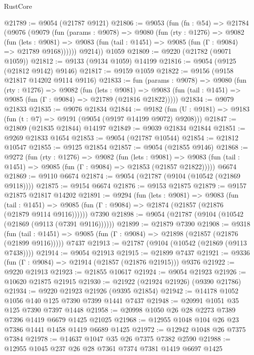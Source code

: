 \begin{lexlean}{RustCore}
\begin{coremodule}
@21789 := @9054 (@21787 @9121)
@21806 := @9053
    (fun (fn : @54) =>
    @21784
      (@9076
        (@9079
          (fun (params : @9078) =>
          @9080
            (fun (rty : @1276) =>
            @9082
              (fun (lets : @9081) =>
              @9083 (fun (tail : @1451) => @9085 (fun (Γ : @9084) => @21789 @9168))))))
        @9214))
    @1059
@21809 := @9220 (@21782 (@9071 @1059))
@21812 := @9133 (@9134 @1059) @14199
@21816 := @9054 (@9125 (@21812 @9142) @9146)
@21817 := @9159 @1059
@21822 := @9156 (@9158 @21817 @14202 @9114 @9116)
@21833 := fun (params : @9078) =>
  @9080
    (fun (rty : @1276) =>
    @9082
      (fun (lets : @9081) =>
      @9083 (fun (tail : @1451) => @9085 (fun (Γ : @9084) => @21789 (@21816 @21822)))))
@21834 := @9079 @21833
@21835 := @9076 @21834
@21844 := @9182
    (fun (U : @9181) => @9183 (fun (t : @7) => @9191 (@9054 (@9197 @14199 @9072) @9208)))
@21847 := @21809 (@21835 @21844) @14197
@21849 := @9039 @21834 @21844
@21851 := @9269 @21833 @1654
@21853 := @9054 (@21787 @10544)
@21854 := @21812 @10547
@21855 := @9125 @21854
@21857 := @9054 (@21855 @9146)
@21868 := @9272
    (fun (rty : @1276) =>
    @9082
      (fun (lets : @9081) =>
      @9083 (fun (tail : @1451) => @9085 (fun (Γ : @9084) => @21853 (@21857 @21822)))))
    @6674
@21869 := @9110 @6674
@21874 := @9054 (@21787 (@9104 (@10542 (@21869 @9118))))
@21875 := @9154 @6674
@21876 := @9153 @21875
@21879 := @9157 @21875 @21817 @14202
@21891 := @9294
    (fun (lets : @9081) =>
    @9083
      (fun (tail : @1451) =>
      @9085 (fun (Γ : @9084) => @21874 (@21857 (@21876 (@21879 @9114 @9116))))))
    @7390
@21898 := @9054 (@21787 (@9104 (@10542 (@21869 (@9113 (@7391 @9116))))))
@21899 := @21879 @7390
@21908 := @9318
    (fun (tail : @1451) => @9085 (fun (Γ : @9084) => @21898 (@21857 (@21876 (@21899 @9116)))))
    @7437
@21913 := @21787 (@9104 (@10542 (@21869 (@9113 @7438))))
@21914 := @9054 @21913
@21915 := @21899 @7437
@21921 := @9336 (fun (Γ : @9084) => @21914 (@21857 (@21876 @21915))) @9376
@21922 := @9220 @21913
@21923 := @21855 @10617
@21924 := @9054 @21923
@21926 := @10620 @21875 @21915
@21930 := @21922 (@21924 @21926) (@9390 @21786)
@21934 := @9220 @21923 @21926 (@9395 @21854)
@21942 := @14178 @1052 @1056 @140 @125 @7390 @7399 @1441 @7437
@21948 := @20991 @1051 @35 @125 @7390 @7397 @1448
@21958 := @20998 @1050 @26 @28 @2273 @7389 @7396 @1419 @6679 @1425 @21025
@21968 := @12955 @1048 @104 @26 @23 @7386 @1441 @1458 @1419 @6689 @1425
@21972 := @12942 @1048 @26 @7375 @7384
@21978 := @14637 @1047 @35 @26 @7375 @7382 @2590
@21988 := @12955 @1045 @237 @26 @28 @7361 @7374 @7381 @1419 @6697 @1425

\end{coremodule}
\end{lexlean}
